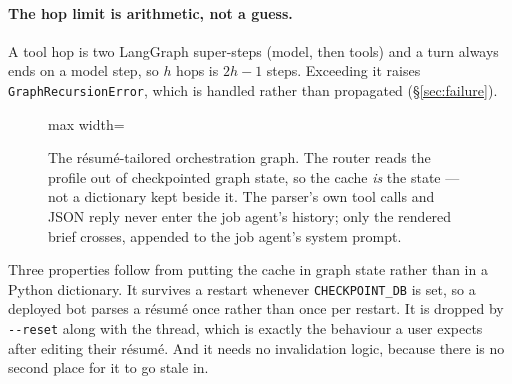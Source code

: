 \documentclass[11pt,a4paper]{article}
\begin{document}
\paragraph{The hop limit is arithmetic, not a guess.} A tool hop is two LangGraph
super-steps (model, then tools) and a turn always ends on a model step, so $h$ hops is
$2h-1$ steps. Exceeding it raises \texttt{GraphRecursionError}, which is handled rather than
propagated (\S\ref{sec:failure}).

\begin{figure}[!ht]
\centering
\begin{adjustbox}{max width=\textwidth}
\end{adjustbox}
\caption{The résumé-tailored orchestration graph. The router reads the profile out of
checkpointed graph state, so the cache \emph{is} the state --- not a dictionary kept beside
it. The parser's own tool calls and JSON reply never enter the job agent's history; only the
rendered brief crosses, appended to the job agent's system prompt.}
\label{fig:orch}
\end{figure}

Three properties follow from putting the cache in graph state rather than in a Python
dictionary. It survives a restart whenever \texttt{CHECKPOINT\_\allowbreak{}DB} is set, so a deployed bot
parses a résumé once rather than once per restart. It is dropped by
\texttt{-{}-reset} along with the thread, which is exactly the behaviour a user expects
after editing their résumé. And it needs no invalidation logic, because there is no second
place for it to go stale in.
\end{document}
